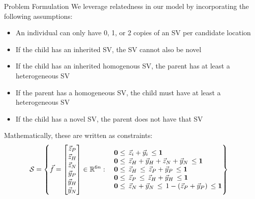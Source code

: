 \documentclass[10pt, t]{beamer}
\begin{document}
\begin{frame}{Problem Formulation}
	We leverage relatedness in our model by incorporating the following assumptions:
	\pause
	\begin{itemize}
		\item An individual can only have 0, 1, or 2 copies of an SV per candidate location
		\pause
		
		\item 	If the child has an inherited SV,  the SV cannot also be novel
		\pause
		
		\item 	If the child has an inherited homogenous SV, the parent has at least a heterogeneous SV 
		\pause
		
		\item 	If the parent has a homogeneous SV, the child must have at least a heterogeneous SV
		\pause
		
		\item 	If the child has a novel SV, the parent does not have that SV
		
	\end{itemize}
\pause
Mathematically, these are written as constraints:
\begin{align*}
	\mathcal{S} = \left\{
	\vec{f} = 
	\begin{bmatrix}
		\zP \\ \zH \\ \zN \\ \yP \\ \yH \\ \yN 
	\end{bmatrix} \in \R^{6n} : 
	\begin{matrix*}[l]
		&\mathbf{0} \leq \, \vec{z}_i + \vec{y}_i \, \leq \mathbf{1}\\
		& \mathbf{0} \leq \, \zH + \yH + \zN + \yN \, \leq \mathbf{1}\\
		&\mathbf{0} \leq \, \zH   \, \leq \, \zP + \yP  \, \leq \mathbf{1}\\
		&\mathbf{0} \leq \, \zP   \, \leq \, \zH + \yH  \, \leq \mathbf{1}\\
		&\mathbf{0} \leq \, \zN + \yN   \, \leq \, 1- (\zP +\yP)  \, \leq \mathbf{1}
	\end{matrix*}
	\right\}
\end{align*}

	
\end{frame}
\end{document}
